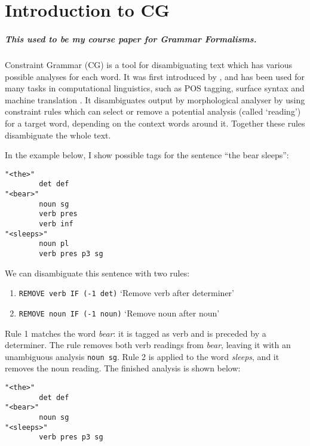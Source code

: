 \chapter{Introduction to CG}

\paragraph{This used to be my course paper for Grammar Formalisms.}

Constraint Grammar (CG) is a tool for disambiguating text which has various
possible analyses for each word. It was first introduced by
\cite{karlsson1995constraint}, and has been used for many tasks in
computational linguistics, such as POS tagging, surface syntax and
machine translation \cite{bick2011}. It disambiguates output by
morphological analyser by using
constraint rules which can select or remove a potential analysis
(called `reading') for a
target word, depending on the context words around it. Together these rules disambiguate the whole text.

In the example below, I show possible tags for the sentence ``the bear
sleeps'':


\begin{verbatim}
"<the>"
        det def
"<bear>"
        noun sg
        verb pres
        verb inf
"<sleeps>"
        noun pl
        verb pres p3 sg
\end{verbatim}

\noindent We can disambiguate this sentence with two rules:

\begin{enumerate}
\def\labelenumi{\arabic{enumi}.}
\itemsep1pt\parskip0pt
\item \texttt{REMOVE verb IF (-1 det)}
  `Remove verb after determiner'
\item  \texttt{REMOVE noun IF (-1 noun)}
  `Remove noun after noun'
\end{enumerate}

\noindent Rule 1 matches the word \emph{bear}: it is tagged as verb and is
preceded by a determiner. The rule removes both verb readings from
\emph{bear}, leaving it with an unambiguous analysis \texttt{noun sg}.
Rule 2 is applied to the word \emph{sleeps}, and it removes the noun
reading. The finished analysis is shown below:


\begin{verbatim}
"<the>"
        det def
"<bear>"
        noun sg
"<sleeps>"
        verb pres p3 sg
\end{verbatim}

